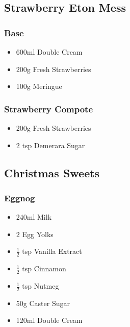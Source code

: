 \documentclass[11pt, english]{article}
\begin{document}
\newpage

	\subsection{Strawberry Eton Mess}

		\subsubsection*{Base}

	\begin{itemize}
        \setlength\itemsep{0cm}
                \item 600ml Double Cream
		\item 200g Fresh Strawberries
		\item 100g Meringue
        \end{itemize}

		\subsubsection*{Strawberry Compote}

	\begin{itemize}
        \setlength\itemsep{0cm}
                \item 200g Fresh Strawberries
		\item 2 tsp Demerara Sugar
        \end{itemize}

\newpage

	\subsection{Christmas Sweets}

		\subsubsection*{Eggnog}

	\begin{itemize}
        \setlength\itemsep{0cm}
                \item 240ml Milk
		\item 2 Egg Yolks
		\item $\frac{1}{2}$ tsp Vanilla Extract
		\item $\frac{1}{2}$ tsp Cinnamon
		\item $\frac{1}{2}$ tsp Nutmeg
		\item 50g Caster Sugar
		\item 120ml Double Cream
        \end{itemize}
\end{document}
